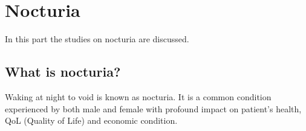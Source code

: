 \section{Nocturia}

In this part the studies on nocturia are discussed. 

\subsection{What is nocturia?}

Waking at night to void is known as nocturia. It is a common condition experienced by both male and female with profound impact on patient's health, \gls{QoL} (Quality of Life) and economic condition. ~\textcite{nocturia_symptom}